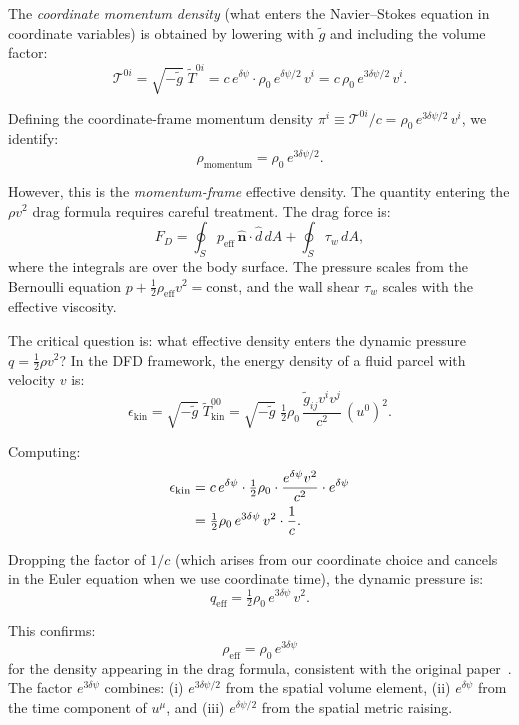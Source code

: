 \documentclass[12pt,twocolumn]{article}
\newcommand{\Reff}{\mathrm{eff}}
\newcommand{\nvec}{\hat{\mathbf{n}}}
\newcommand{\dpsi}{\delta\psi}
\newcommand{\half}{\tfrac{1}{2}}
\begin{document}
The \emph{coordinate momentum density} (what enters the Navier--Stokes
equation in coordinate variables) is obtained by lowering with $\tilde{g}$
and including the volume factor:
\begin{equation}
\mathcal{T}^{0i} = \sqrt{-\tilde{g}}\;\tilde{T}^{0i}
= c\,e^{\dpsi}\cdot \rho_0\,e^{\dpsi/2}\,v^i
= c\,\rho_0\,e^{3\dpsi/2}\,v^i.
\end{equation}

Defining the coordinate-frame momentum density $\pi^i \equiv
\mathcal{T}^{0i}/c = \rho_0\,e^{3\dpsi/2}\,v^i$, we identify:
\begin{equation}
\rho_\mathrm{momentum} = \rho_0\,e^{3\dpsi/2}.
\end{equation}

However, this is the \emph{momentum-frame} effective density. The quantity
entering the $\rho v^2$ drag formula requires careful treatment. The drag
force is:
\begin{equation}
F_D = \oint_S p_\Reff\,\nvec\cdot\hat{d}\,dA + \oint_S \tau_w\,dA,
\end{equation}
where the integrals are over the body surface. The pressure scales from the
Bernoulli equation $p + \half\rho_\Reff v^2 = \mathrm{const}$, and the
wall shear $\tau_w$ scales with the effective viscosity.

The critical question is: what effective density enters the dynamic pressure
$q = \half\rho v^2$? In the DFD framework, the energy density of a fluid
parcel with velocity $v$ is:
\begin{equation}
\epsilon_\mathrm{kin} = \sqrt{-\tilde{g}}\;\tilde{T}^{00}_\mathrm{kin}
= \sqrt{-\tilde{g}}\;\half\rho_0\,\frac{\tilde{g}_{ij}v^iv^j}{c^2}\,(u^0)^2.
\end{equation}

Computing:
\begin{align}
\epsilon_\mathrm{kin} &= c\,e^{\dpsi}\cdot\half\rho_0\cdot
\frac{e^{\dpsi}v^2}{c^2}\cdot e^{\dpsi} \notag\\
&= \half\rho_0\,e^{3\dpsi}\,v^2\cdot\frac{1}{c}.
\end{align}

Dropping the factor of $1/c$ (which arises from our coordinate choice and
cancels in the Euler equation when we use coordinate time), the dynamic
pressure is:
\begin{equation}
q_\Reff = \half\rho_0\,e^{3\dpsi}\,v^2.
\label{eq:q_eff}
\end{equation}

This confirms:
\begin{equation}
\boxed{\rho_\Reff = \rho_0\,e^{3\dpsi}}
\end{equation}
for the density appearing in the drag formula, consistent with the original
paper~\cite{alcock2026drag}. The factor $e^{3\dpsi}$ combines:
(i) $e^{3\dpsi/2}$ from the spatial volume element,
(ii) $e^{\dpsi}$ from the time component of $u^\mu$, and
(iii) $e^{\dpsi/2}$ from the spatial metric raising.
\end{document}
